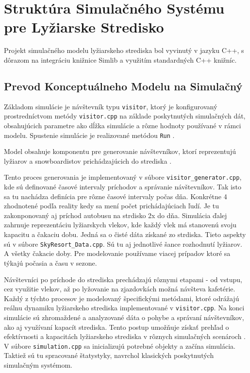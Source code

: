 ﻿\section{Struktúra Simulačného Systému pre Lyžiarske Stredisko}
Projekt simulačného modelu lyžiarskeho strediska bol vyvinutý v jazyku C++, s dôrazom na integráciu knižnice Simlib a využitím standardných C++ knižníc.
\subsection{Prevod Konceptuálneho Modelu na Simulačný}
Základom simulácie je návštevník typu \texttt{visitor}, ktorý je konfigurovaný prostredníctvom metódy \texttt{visitor.cpp} na základe poskytnutých simulačných dát, obsahujúcich parametre ako dĺžka simulácie a rôzne hodnoty používané v rámci modelu. Spustenie simulácie je realizované metódou \texttt{Run} .

Model obsahuje komponentu pre generovanie návštevníkov, ktorí reprezentujú lyžiarov a snowboardistov prichádzajúcich do strediska .

Tento proces generovania je implementovaný v súbore \texttt{visitor_generator.cpp}, kde sú definované časové intervaly príchodov a správanie návštevníkov. 
Tak isto sa tu nachádza definícia pre rôzne časové intervaly počas dňa.  Konkrétne 4 zhodnotené podľa reality kedy sa mení počet prichádajúciach ľudí. 
Je tu zakonponovaný aj príchod autobusu na strdisko 2x do dňa. 
Simulácia ďalej zahrnuje reprezentáciu lyžiarskych vlekov, kde každý vlek má stanovenú svoju kapacitu a čakaciu dobu. Jedná sa o čisté dáta získané zo strdiska.
Tieto aspekty sú v súbore \texttt{SkyResort_Data.cpp}. Sú tu aj jednotlivé šance rozhodnutí lyžiarov. A všetky čakacie doby. 
Pre modelovanie používame viacej prípadov ktoré sa týkajú počasia a času v sezone.

Návštevníci po príchode do strediska prechádzajú rôznymi etapami - od vstupu, cez využitie vlekov, až po lyžovanie na zjazdovkách možná návšteva kafetérie. Každý z týchto procesov je modelovaný špecifickými metódami, ktoré odrážajú reálnu dynamiku lyžiarskeho strediska implementované v \texttt{visitor.cpp}.
Na konci simulácie sú zhromaždené a analyzované dáta o pohybe a správaní návštevníkov, ako aj využívaní kapacít strediska. Tento postup umožňuje získať prehľad o efektívnosti a kapacitách lyžiarskeho strediska v rôznych simulačných scenároch .
V súbore \texttt{simulation.cpp} sa inicializujú potrebné objekty a začína simulácia. Taktiež sú tu spracované štatystyky, navrchol klasických poskytnutých simulačným systémom.